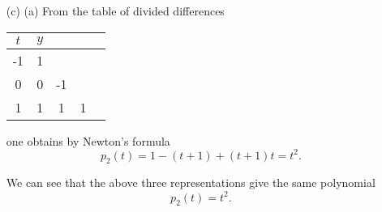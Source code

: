 \begin{sol}
\begin{itemize}
  \item[(c)]
    (a) From the table of divided differences
\begin{center}
\begin{tabular}{c|cccc}
$t$  & $y$ \\
\hline 
-1 & 1 \\
0 & 0 & -1 \\
1 & 1 & 1 & 1
\end{tabular}
\end{center}
one obtains by Newton's formula
\begin{displaymath}
  p_2(t) = 1 - (t+1) + (t+1)t = t^2.
\end{displaymath}

We can see that the above three representations give the same polynomial
\begin{displaymath}
  p_2(t) = t^2.
\end{displaymath}
  \end{itemize}
\end{sol}
